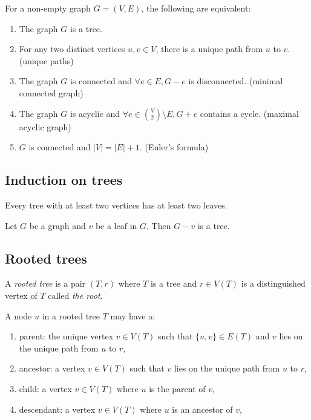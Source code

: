 \documentclass{classnotes}
\begin{document}
\begin{theorem}
    For a non-empty graph $G=(V,E)$, the following are equivalent:
    \begin{enumerate}
        \item The graph $G$ is a tree.
        \item For any two distinct vertices $u,v \in V$, there is a unique path from $u$ to $v$. \hfill (unique paths)
        \item The graph $G$ is connected and $\forall e \in E, G-e$ is disconnected. \hfill (minimal connected graph)
        \item The graph $G$ is acyclic and $\forall e \in \binom{V}{2}\setminus E, G+e$ contains a cycle. \hfill (maximal acyclic graph)
        \item $G$ is connected and $|V| = |E|+1$. \hfill (Euler's formula)
    \end{enumerate}
\end{theorem}

\subsection{Induction on trees}
\begin{lemma}
    Every tree with at least two vertices has at least two leaves.
\end{lemma}
\begin{lemma}
    Let $G$ be a graph and $v$ be a leaf in $G$. Then $G-v$ is a tree.
\end{lemma}

\subsection{Rooted trees}
\begin{definition}
    A \emph{rooted tree} is a pair $(T,r)$  where $T$ is a tree and $r \in V(T)$ is a distinguished vertex of $T$ called \emph{the root}.

    A node $u$ in a rooted tree $T$ may have a:
    \begin{enumerate}
        \item parent: the unique vertex $v \in V(T)$ such that $\{u,v\} \in E(T)$ and $v$ lies on the unique path from $u$ to $r$,
        \item ancestor: a vertex $v \in V(T)$ such that $v$ lies on the unique path from $u$ to $r$,
        \item child: a vertex $v \in V(T)$ where $u$ is the parent of $v$,
        \item descendant: a vertex $v \in V(T)$ where $u$ is an ancestor of $v$,
    \end{enumerate}
\end{definition}
\end{document}
